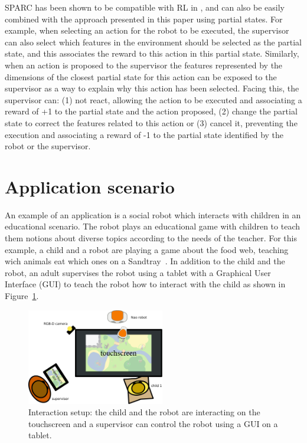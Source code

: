 \documentclass[letterpaper]{article} %
\begin{document}
SPARC has been shown to be compatible with RL in \cite{senft2017supervised},
and can also be easily combined with the approach presented in this paper using
partial states. For example, when selecting an action for the robot to be
executed, the supervisor can also select which features in the environment
should be selected as the partial state, and this associates the reward 
to this action in this partial state. Similarly, when an action is
proposed to the supervisor the features represented by the dimensions of the
closest partial state for this action can be exposed to the supervisor as a way to explain why
this action has been selected. Facing this, the supervisor can: (1) not react,
allowing the action to be executed and associating a reward of +1 to the partial
state and the action proposed, (2) change the partial state to correct the features
related to this action or (3) cancel it, preventing the execution and associating a
reward of -1 to the partial state identified by the robot or the supervisor. 

\section{Application scenario}

An example of an application is a social robot which interacts with children in an educational scenario.
The robot plays an educational game with children to teach them notions about
diverse topics according to the needs of the teacher. For this example, a child
and a robot are playing a game about the food web, teaching wich animals eat which
ones on a Sandtray~\cite{baxter2012touchscreen}. In addition to the child and
the robot, an adult supervises the robot using a tablet with a Graphical User
Interface (GUI) to teach the robot how to interact with the child as shown in
Figure~\ref{fig:setup}.
\begin{figure}
        \centering
  \includegraphics[width=60mm]{./figs/setup} 
    \caption{Interaction setup: the child and the robot are interacting on the
    touchscreen and a supervisor can control the robot using a GUI on a tablet.}
        \label{fig:setup}
\end{figure}
\end{document}
